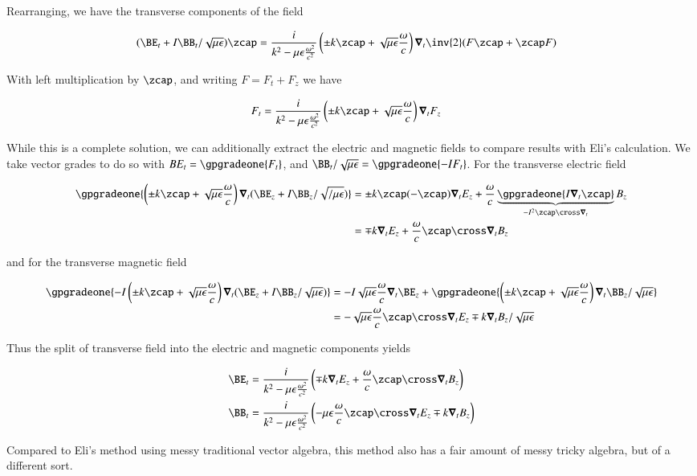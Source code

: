 Rearranging, we have the transverse components of the field

\begin{align}
(\BE_t + I \BB_t/\sqrt{\mu\epsilon}) \zcap &=
\frac{i}{k^2 - \mu\epsilon\frac{\omega^2}{c^2}} \left( \pm k \zcap + \sqrt{\mu\epsilon}\frac{\omega}{c}\right) \spacegrad_t \inv{2}( F \zcap + \zcap F) 
\end{align}

With left multiplication by $\zcap$, and writing $F = F_t + F_z$ we have

\begin{align}\label{eqn:transverseBoth}
F_t &= \frac{i}{k^2 - \mu\epsilon\frac{\omega^2}{c^2}} \left( \pm k \zcap + \sqrt{\mu\epsilon}\frac{\omega}{c}\right) \spacegrad_t F_z
\end{align}

While this is a complete solution, we can additionally extract the electric and magnetic fields to compare results with Eli's calculation.  We take 
vector grades to do so with $BE_t = \gpgradeone{F_t}$, and $\BB_t/\sqrt{\mu\epsilon} = \gpgradeone{-I F_t}$.   For the transverse electric field

\begin{align*}
\gpgradeone{ \left( \pm k \zcap + \sqrt{\mu\epsilon}\frac{\omega}{c}\right) \spacegrad_t (\BE_z + I \BB_z/\sqrt{/\mu\epsilon}) } 
&=
\pm k \zcap (-\zcap) \spacegrad_t E_z + \frac{\omega}{c} \underbrace{\gpgradeone{I \spacegrad_t \zcap}}_{-I^2 \zcap \cross \spacegrad_t } B_z \\
&=
\mp k \spacegrad_t E_z + \frac{\omega}{c} \zcap \cross \spacegrad_t B_z \\
\end{align*}

and for the transverse magnetic field

\begin{align*}
\gpgradeone{ -I \left( \pm k \zcap + \sqrt{\mu\epsilon}\frac{\omega}{c}\right) \spacegrad_t (\BE_z + I \BB_z/\sqrt{\mu\epsilon}) } 
&=
-I \sqrt{\mu\epsilon}\frac{\omega}{c} \spacegrad_t \BE_z
+\gpgradeone{ \left( \pm k \zcap + \sqrt{\mu\epsilon}\frac{\omega}{c}\right) \spacegrad_t \BB_z/\sqrt{\mu\epsilon} }  \\
&=
- \sqrt{\mu\epsilon}\frac{\omega}{c} \zcap \cross \spacegrad_t E_z
\mp k \spacegrad_t B_z/\sqrt{\mu\epsilon} \\
\end{align*}

Thus the split of transverse field into the electric and magnetic components yields

\begin{align}\label{eqn:transversePair}
\BE_t &= \frac{i}{k^2 - \mu\epsilon\frac{\omega^2}{c^2}} \left( \mp k \spacegrad_t E_z + \frac{\omega}{c} \zcap \cross \spacegrad_t B_z \right) \\
\BB_t &= \frac{i}{k^2 - \mu\epsilon\frac{\omega^2}{c^2}} \left( - {\mu\epsilon}\frac{\omega}{c} \zcap \cross \spacegrad_t E_z \mp k \spacegrad_t B_z \right) 
\end{align}

Compared to Eli's method using messy traditional vector algebra, this method also has a fair amount of messy tricky algebra, but of a different sort.

\EndNoBibArticle
